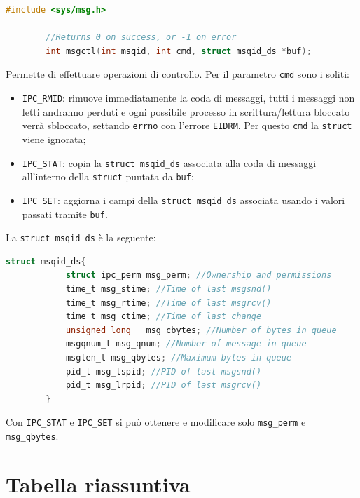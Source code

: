 \documentclass[a4paper, 12pt]{book}
\begin{document}
    \begin{lstlisting}[language=C]
        #include <sys/msg.h>

        //Returns 0 on success, or -1 on error 
        int msgctl(int msqid, int cmd, struct msqid_ds *buf);
    \end{lstlisting}
    Permette di effettuare operazioni di controllo. 
    Per il parametro \verb|cmd| sono i soliti:
    \begin{itemize}
        \item \verb|IPC_RMID|: rimuove immediatamente 
        la coda di messaggi, tutti i messaggi non letti 
        andranno perduti e ogni possibile processo in 
        scrittura/lettura bloccato verrà sbloccato, settando 
        \verb|errno| con l'errore \verb|EIDRM|. Per questo
        \verb|cmd| la \verb|struct| viene ignorata;
        \item \verb|IPC_STAT|: copia la \verb|struct msqid_ds| 
        associata alla coda di messaggi all'interno della 
        \verb|struct| puntata da \verb|buf|;
        \item \verb|IPC_SET|: aggiorna i campi della \verb|struct msqid_ds| 
        associata usando i valori passati tramite \verb|buf|.
    \end{itemize}
    La \verb|struct msqid_ds| è la seguente:
    \begin{lstlisting}[language=C]
        struct msqid_ds{
            struct ipc_perm msg_perm; //Ownership and permissions 
            time_t msg_stime; //Time of last msgsnd() 
            time_t msg_rtime; //Time of last msgrcv() 
            time_t msg_ctime; //Time of last change 
            unsigned long __msg_cbytes; //Number of bytes in queue 
            msgqnum_t msg_qnum; //Number of message in queue 
            msglen_t msg_qbytes; //Maximum bytes in queue 
            pid_t msg_lspid; //PID of last msgsnd() 
            pid_t msg_lrpid; //PID of last msgrcv()
        }
    \end{lstlisting}
    Con \verb|IPC_STAT| e \verb|IPC_SET| si può ottenere 
    e modificare solo \verb|msg_perm| e \verb|msg_qbytes|.
    
    \section{Tabella riassuntiva}
    
\end{document}
